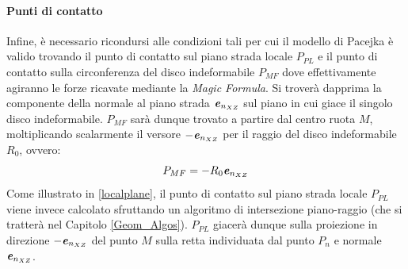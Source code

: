 \paragraph{Punti di contatto}
\label{Punti_contatto_rill}
Infine, è necessario ricondursi alle condizioni tali per cui il modello di Pacejka è valido trovando il punto di contatto sul piano strada locale $P_{PL}$ e il punto di contatto sulla circonferenza del disco indeformabile $P_{MF}$ dove effettivamente agiranno le forze ricavate mediante la \textit{Magic Formula}. Si troverà dapprima la componente della normale al piano strada $\textbf{\textit{e}}_{n_{XZ}}$ sul piano in cui giace il singolo disco indeformabile. $P_{MF}$ sarà dunque trovato a partire dal centro ruota $M$, moltiplicando scalarmente il versore $-\textbf{\textit{e}}_{n_{XZ}}$ per il raggio del disco indeformabile $R_0$, ovvero:
%
\begin{equation}
P_{MF} = -R_0\textbf{\textit{e}}_{n_{XZ}}
\label{puntoMF}
\end{equation}
%
Come illustrato in \figurename{ \ref{localplane}}, il punto di contatto sul piano strada locale $P_{PL}$ viene invece calcolato sfruttando un algoritmo di intersezione piano-raggio (che si tratterà nel Capitolo \ref{Geom_Algos}). $P_{PL}$ giacerà dunque sulla proiezione in direzione $-\textbf{\textit{e}}_{n_{XZ}}$ del punto $M$ sulla retta individuata dal punto $P_n$ e normale $\textbf{\textit{e}}_{n_{XZ}}$.

